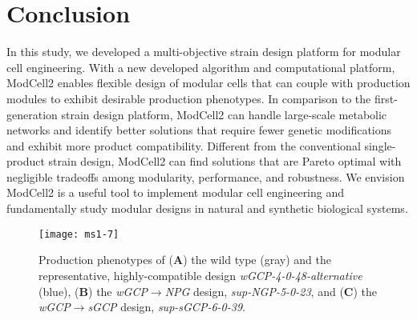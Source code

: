 \section{Conclusion}

In this study, we developed a multi-objective strain design platform for modular cell engineering.
With a new developed algorithm and computational platform, ModCell2 enables flexible design of modular cells that can couple with production modules to exhibit desirable production phenotypes.
In comparison to the first-generation strain design platform, ModCell2 can handle large-scale metabolic networks and identify better solutions that require fewer genetic modifications and exhibit more product compatibility.
Different from the conventional single-product strain design, ModCell2 can find solutions that are Pareto optimal with negligible tradeoffs among modularity, performance, and robustness.
We envision ModCell2 is a useful tool to implement modular cell engineering and fundamentally study modular designs in natural and synthetic biological systems.

\begin{figure}[H]
  \centering
  \texttt{[image: ms1-7]}
    \caption[Production phenotypes of proposed designs]{
Production phenotypes of (\textbf{A}) the wild type
(gray) and the representative, highly-compatible design
\emph{wGCP-4-0-48-alternative} (blue), (\textbf{B}) the
\emph{wGCP}$\rightarrow$\emph{NPG} design, \emph{sup-NGP-5-0-23}, and (\textbf{C})
the \emph{wGCP}$\rightarrow$\emph{sGCP} design, \emph{sup-sGCP-6-0-39}.
    }
    \label{fig:ms1-fig7}
\end{figure}

%
%


